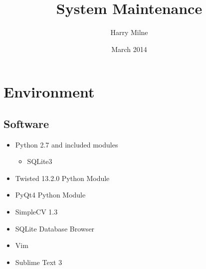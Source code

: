 \documentclass[a4paper]{article}
\title{System Maintenance}
\author{Harry Milne}
\date{March 2014}
\begin{document}
\newpage
\tableofcontents

\maketitle

\section{Environment}
\label{sec:env}
\subsection{Software}
\begin{itemize}
    \item Python 2.7 and included modules
    
    \begin{itemize}
        \item SQLite3
    \end{itemize}
    
    \item Twisted 13.2.0 Python Module
    \item PyQt4 Python Module
    \item SimpleCV 1.3
    \item SQLite Database Browser
    \item Vim
    \item Sublime Text 3
\end{itemize}
\end{document}
